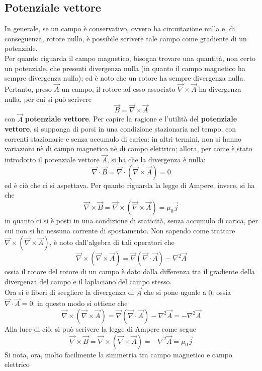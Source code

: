 \documentclass[a4paper]{extarticle}
\begin{document}
\subsection{Potenziale vettore}
In generale, se un campo è conservativo, ovvero ha circuitazione nulla e, di conseguenza, rotore nullo, è possibile scrivere tale campo come gradiente di un potenziale.\\
Per quanto riguarda il campo magnetico, bisogna trovare una quantità, non certo un potenziale, che presenti divergenza nulla (in quanto il campo magnetico ha sempre divergenza nulla); ed è noto che un rotore ha sempre divergenza nulla. Pertanto, preso $\vec A$ un campo, il rotore ad esso associato $\vec \nabla \times \vec A$ ha divergenza nulla, per cui si può scrivere
\[\vec B = \vec \nabla \times \vec A\]
con $\vec A$ \textbf{potenziale vettore}. Per capire la ragione e l'utilità del \textbf{potenziale vettore}, si supponga di porsi in una condizione stazionaria nel tempo, con correnti stazionarie e senza accumulo di carica: in altri termini, non si hanno variazioni nè di campo magnetico nè di campo elettrico; allora, per come è stato introdotto il potenziale vettore $\vec A$, si ha che la divergenza è nulla:
\[\vec \nabla \cdot \vec B = \vec \nabla \cdot \left(\vec \nabla \times \vec A\right) = 0\]
ed è ciò che ci si aspettava. Per quanto riguarda la legge di Ampere, invece, si ha che
\[\vec \nabla \times \vec B = \vec \nabla \times \left(\vec \nabla \times \vec A\right) = \mu_0 \vec j\]
in quanto ci si è posti in una condizione di staticità, senza accumulo di carica, per cui non si ha nessuna corrente di spostamento. Non sapendo come trattare $\vec \nabla \times \left(\vec \nabla \times \vec A\right)$, è noto dall'algebra di tali operatori che
\[\vec \nabla \times \left(\vec \nabla \times \vec A\right) = \vec \nabla \left(\vec \nabla \cdot \vec A\right) - \nabla^2 \vec A\]
ossia il rotore del rotore di un campo è dato dalla differenza tra il gradiente della divergenza del campo e il laplaciano del campo stesso.\\
Ora si è liberi di scegliere la divergenza di $\vec A$ che si pone uguale a $0$, ossia $\vec \nabla \cdot \vec A = 0$; in questo modo si ottiene che
\[\vec \nabla \times \left(\vec \nabla \times \vec A\right) = \vec \nabla \left(\vec \nabla \cdot \vec A\right) - \nabla^2 \vec A = - \nabla^2 \vec A\]
Alla luce di ciò, si può scrivere la legge di Ampere come segue
\[\vec \nabla \times \vec B = \vec \nabla \times \left(\vec \nabla \times \vec A\right) = - \nabla^2 \vec A = \mu_0 \vec j\]
Si nota, ora, molto facilmente la simmetria tra campo magnetico e campo elettrico
\end{document}
